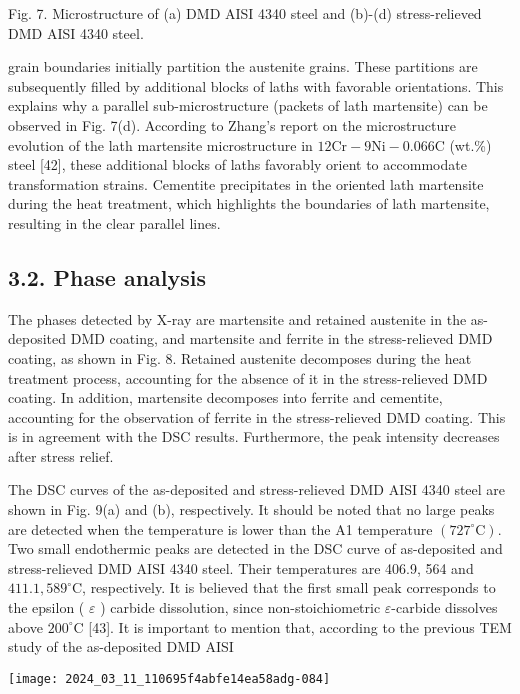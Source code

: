 \documentclass[10pt]{article}
\begin{document}
Fig. 7. Microstructure of (a) DMD AISI 4340 steel and (b)-(d) stress-relieved DMD AISI 4340 steel.

grain boundaries initially partition the austenite grains. These partitions are subsequently filled by additional blocks of laths with favorable orientations. This explains why a parallel sub-microstructure (packets of lath martensite) can be observed in Fig. 7(d). According to Zhang's report on the microstructure evolution of the lath martensite microstructure in $12 \mathrm{Cr}-9 \mathrm{Ni}-0.066 \mathrm{C}$ (wt.\%) steel [42], these additional blocks of laths favorably orient to accommodate transformation strains. Cementite precipitates in the oriented lath martensite during the heat treatment, which highlights the boundaries of lath martensite, resulting in the clear parallel lines.

\subsection*{3.2. Phase analysis}
The phases detected by X-ray are martensite and retained austenite in the as-deposited DMD coating, and martensite and ferrite in the stress-relieved DMD coating, as shown in Fig. 8. Retained austenite decomposes during the heat treatment process, accounting for the absence of it in the stress-relieved DMD coating. In addition, martensite decomposes into ferrite and cementite, accounting for the observation of ferrite in the stress-relieved DMD coating. This is in agreement with the DSC results. Furthermore, the peak intensity decreases after stress relief.

The DSC curves of the as-deposited and stress-relieved DMD AISI 4340 steel are shown in Fig. 9(a) and (b), respectively. It should be noted that no large peaks are detected when the temperature is lower than the A1 temperature $\left(727^{\circ} \mathrm{C}\right)$. Two small endothermic peaks are detected in the DSC curve of as-deposited and stress-relieved DMD AISI 4340 steel. Their temperatures are 406.9, 564 and $411.1,589^{\circ} \mathrm{C}$, respectively. It is believed that the first small peak corresponds to the epsilon ( $\varepsilon$ ) carbide dissolution, since non-stoichiometric $\varepsilon$-carbide dissolves above $200^{\circ} \mathrm{C}$ [43]. It is important to mention that, according to the previous TEM study of the as-deposited DMD AISI

\begin{center}
\texttt{[image: 2024\_03\_11\_110695f4abfe14ea58adg-084]}
\end{center}
\end{document}
